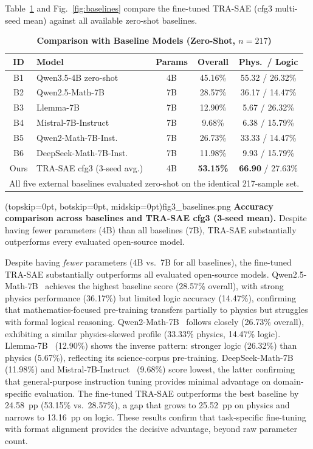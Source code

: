 \documentclass{ieeeaccess}
\newcommand{\modelname}{\textsc{TRA-SAE}}
\newcommand{\basemodelname}{Qwen3.5-4B}
\begin{document}
Table~\ref{tab:baselines} and Fig.~\ref{fig:baselines} compare the
fine-tuned \modelname{} (cfg3 multi-seed mean) against all available
zero-shot baselines.

\begin{table}[t]
\caption{\textbf{Comparison with Baseline Models (Zero-Shot, $n=217$)}}
\label{tab:baselines}
\centering
\setlength{\tabcolsep}{3.5pt}
\begin{tabular}{clccc}
\toprule
\textbf{ID} & \textbf{Model} & \textbf{Params}
  & \textbf{Overall} & \textbf{Phys.\ / Logic} \\
\midrule
B1  & \basemodelname{} zero-shot      & 4B & 45.16\% & 55.32 / 26.32\% \\
B2  & Qwen2.5-Math-7B~\cite{b5}       & 7B & 28.57\% & 36.17 / 14.47\% \\
B3  & Llemma-7B~\cite{b6}             & 7B & 12.90\% &  5.67 / 26.32\% \\
B4  & Mistral-7B-Instruct~\cite{b26}  & 7B &  9.68\% &  6.38 / 15.79\% \\
B5  & Qwen2-Math-7B-Inst.~\cite{b31} & 7B & 26.73\% & 33.33 / 14.47\% \\
B6  & DeepSeek-Math-7B-Inst.~\cite{b30} & 7B & 11.98\% &  9.93 / 15.79\% \\
\midrule
Ours & \modelname{} cfg3 (3-seed avg.)& 4B & \textbf{53.15\%} & \textbf{66.90} / 27.63\% \\
\bottomrule
\multicolumn{5}{l}{\footnotesize All five external baselines evaluated zero-shot on the identical 217-sample set.}
\end{tabular}
\end{table}

\Figure[t!](topskip=0pt, botskip=0pt, midskip=0pt){fig3_baselines.png}{%
  \textbf{Accuracy comparison across baselines and \modelname{} cfg3
  (3-seed mean).}
  Despite having fewer parameters (4B) than all baselines (7B),
  \modelname{} substantially outperforms every evaluated open-source model.
  \label{fig:baselines}}

Despite having \emph{fewer} parameters (4B vs.\ 7B for all baselines),
the fine-tuned \modelname{} substantially outperforms all evaluated
open-source models.
Qwen2.5-Math-7B~\cite{b5} achieves the highest baseline score (28.57\%
overall), with strong physics performance (36.17\%) but limited logic
accuracy (14.47\%), confirming that mathematics-focused pre-training
transfers partially to physics but struggles with formal logical
reasoning.
Qwen2-Math-7B~\cite{b31} follows closely (26.73\% overall), exhibiting
a similar physics-skewed profile (33.33\% physics, 14.47\% logic).
Llemma-7B~\cite{b6} (12.90\%) shows the inverse pattern: stronger logic
(26.32\%) than physics (5.67\%), reflecting its science-corpus pre-training.
DeepSeek-Math-7B~\cite{b30} (11.98\%) and Mistral-7B-Instruct~\cite{b26}
(9.68\%) score lowest, the latter confirming that general-purpose
instruction tuning provides minimal advantage on domain-specific
evaluation.
The fine-tuned \modelname{} outperforms the best baseline by
24.58~pp (53.15\% vs.\ 28.57\%), a gap that grows to 25.52~pp on physics
and narrows to 13.16~pp on logic.
These results confirm that task-specific fine-tuning with format
alignment provides the decisive advantage, beyond raw parameter count.
\end{document}

